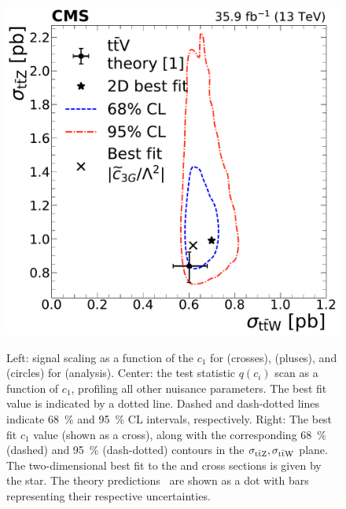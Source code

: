 \begin{landscape}
\begin{figure}
{        \includegraphics[height=\textheight]{figures/thirteen-TeV/NP/2D/ttZ_ttW_2D_1D_tc3G}
      }
    \setlength{\capwidth}{14cm}
    \caption[Profile likelihood, $\mu(c_1)$, and best fit $c_1$ for \tcthreeG (\thirteenTeV)]{Left: signal scaling as a function of the $c_1$ for \ttW (crosses), \ttZ (pluses), and \ttH (circles) for \tcthreeG (\thirteenTeV analysis). Center: the test statistic $q(c_i)$ scan as a function of $c_1$, profiling all other nuisance parameters. The best fit value is indicated by a dotted line. Dashed and dash-dotted lines indicate \SI{68}{\percent} and \SI{95}{\percent} CL intervals, respectively. Right: The best fit $c_1$ value (shown as a cross), along with the corresponding \SI{68}{\percent} (dashed) and \SI{95}{\percent} (dash-dotted) contours in the $\sigma_{\text{t}\bar{\text{t}}\text{Z}}, \sigma_{\text{t}\bar{\text{t}}\text{W}}$ plane. The two-dimensional best fit to the \ttW and \ttZ cross sections is given by the star. The theory predictions~\cite{deFlorian:2016spz} are shown as a dot with bars representing their respective uncertainties.}
    \label{fig:results-tc3G}
  \end{figure}
  \begin{figure}
      \resizebox{!}{7.2cm}{
}
\end{figure}
\end{landscape}

